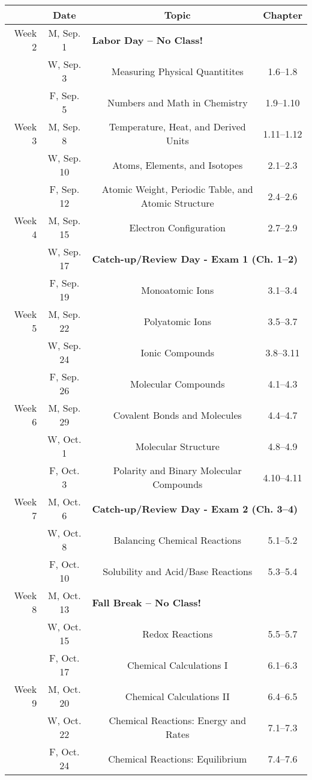 \documentclass[12pt, letterpaper]{article}
\begin{document}
\begin{tabular}{rcccc}
& Date && Topic & Chapter\\
\midrule
Week 2 & M, Sep. 1& \multicolumn{3}{l}{\textbf{Labor Day -- No Class!}}\\
& W, Sep. 3&& Measuring Physical Quantitites & 1.6--1.8\\
& F, Sep. 5&& Numbers and Math in Chemistry & 1.9--1.10\\
\midrule
Week 3 & M, Sep. 8&& Temperature, Heat, and Derived Units & 1.11--1.12\\
& W, Sep. 10&& Atoms, Elements, and Isotopes & 2.1--2.3\\
& F, Sep. 12&& Atomic Weight, Periodic Table, and Atomic Structure & 2.4--2.6\\
\midrule
Week 4 & M, Sep. 15&& Electron Configuration & 2.7--2.9\\
& W, Sep. 17& \multicolumn{3}{l}{\textbf{Catch-up/Review Day - Exam 1 (Ch. 1--2)}}\\
& F, Sep. 19&& Monoatomic Ions & 3.1--3.4\\
\midrule
Week 5 & M, Sep. 22&& Polyatomic Ions & 3.5--3.7\\
& W, Sep. 24&& Ionic Compounds & 3.8--3.11\\
& F, Sep. 26&& Molecular Compounds & 4.1--4.3\\
\midrule
Week 6 & M, Sep. 29&& Covalent Bonds and Molecules & 4.4--4.7\\
& W, Oct. 1&& Molecular Structure & 4.8--4.9\\
& F, Oct. 3&& Polarity and Binary Molecular Compounds & 4.10--4.11\\
\midrule
Week 7 & M, Oct. 6& \multicolumn{3}{l}{\textbf{Catch-up/Review Day - Exam 2 (Ch. 3--4)}}\\
& W, Oct. 8&& Balancing Chemical Reactions & 5.1--5.2\\
& F, Oct. 10&& Solubility and Acid/Base Reactions & 5.3--5.4\\
\midrule
Week 8 & M, Oct. 13& \multicolumn{3}{l}{\textbf{Fall Break -- No Class!}}\\
& W, Oct. 15&& Redox Reactions & 5.5--5.7\\
& F, Oct. 17&& Chemical Calculations I & 6.1--6.3\\
\midrule
Week 9 & M, Oct. 20&& Chemical Calculations II & 6.4--6.5\\
& W, Oct. 22&& Chemical Reactions: Energy and Rates & 7.1--7.3\\
& F, Oct. 24&& Chemical Reactions: Equilibrium & 7.4--7.6\\
\end{tabular}
\end{document}
